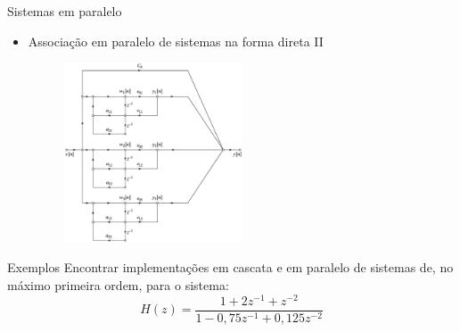 \begin{slide}{Sistemas em paralelo}
\begin{itemize}
   \item Associação em paralelo de sistemas na forma direta II
   \begin{figure}
       \centering
        \includegraphics[width = 0.5\textwidth]{figs/parallel.eps}
   \end{figure}
\end{itemize}
\end{slide}

\begin{slide}{Exemplos}
Encontrar implementações em cascata e em paralelo de sistemas de, no máximo primeira ordem, para o sistema:
	\begin{equation*}
		H(z) =\frac{1+2z^{-1}+z^{-2}}{1-0,75z^{-1}+0,125z^{-2}}
	\end{equation*}
\end{slide}

